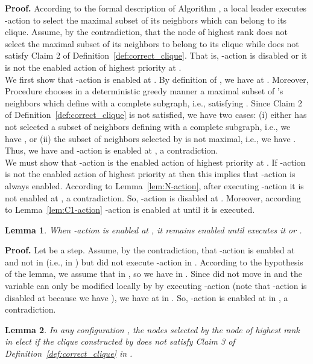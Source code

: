 \documentclass[11pt,letterpaper,onecolumn]{article}
\newtheorem{lemma}{Lemma}
\newenvironment{proof}{\noindent \begin{rm}{\textbf{Proof.} }}{\hspace*{\fill}\par\end{rm} \vspace{.3cm}}
\begin{document}
\begin{proof}
According to the formal description of Algorithm , a local leader executes -action to select the maximal subset of its neighbors which can belong to its clique. Assume, by the contradiction, that the node  of highest rank does not select the maximal subset of its neighbors to belong to its clique  while  does not satisfy Claim 2 of Definition~\ref{def:correct_clique}. That is, -action is disabled or it is not the enabled action of highest priority at .\\
We first show that -action is enabled at . By definition of , we have  at . Moreover, Procedure  chooses in a deterministic greedy manner a maximal subset of 's neighbors which define with  a complete subgraph, i.e., satisfying . Since Claim 2 of Definition~\ref{def:correct_clique} is not satisfied, we have two cases: (i) either  has not selected a subset of neighbors defining with  a complete subgraph, i.e., we have , or (ii) the subset of neighbors selected by  is not maximal, i.e., we have . Thus, we have  and -action is enabled at , a contradiction.\\
We must show that -action is the enabled action of highest priority at . If -action is not the enabled action of highest priority at  then this implies that -action is always enabled. According to Lemma~\ref{lem:N-action}, after executing -action it is not enabled at , a contradiction. So, -action is disabled at . Moreover, according to Lemma~\ref{lem:C1-action} -action is enabled at  until it is executed.
\end{proof}

\begin{lemma}
\label{lem:C2-action}
When -action is enabled at , it remains enabled until  executes it or .
\end{lemma}

\begin{proof}
Let  be a step. Assume, by the contradiction, that -action is enabled at  and not in  (i.e.,  in ) but  did not execute -action in . According to the hypothesis of the lemma, we assume that  in , so we have  in . Since  did not move in  and the variable  can only be modified locally by  by executing -action (note that -action is disabled at  because we have ), we have  at  in . So, -action is enabled at  in , a contradiction.
\end{proof}

\begin{lemma}
\label{lem:elect_clique}
In any configuration , the nodes selected by the node  of highest rank in  elect  if the clique  constructed by  does not satisfy Claim 3 of Definition~\ref{def:correct_clique} in .
\end{lemma}
\end{document}
